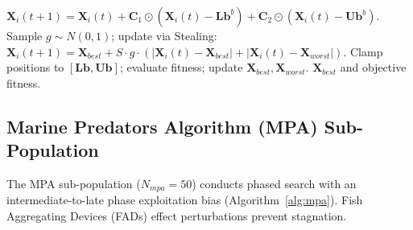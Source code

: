 \documentclass[journal,compsoc]{IEEEtran}
\begin{document}
\begin{algorithm}[!t]
\begin{algorithmic}[1]
        $\mathbf{X}_i(t+1) = \mathbf{X}_i(t) + \mathbf{C}_1 \odot (\mathbf{X}_i(t) - \mathbf{Lb}^b) + \mathbf{C}_2 \odot (\mathbf{X}_i(t) - \mathbf{Ub}^b)$.
    \ENDFOR
        \STATE Sample $g \sim N(0, 1)$; update via Stealing: \\
        $\mathbf{X}_i(t+1) = \mathbf{X}_{best} + S \cdot g \cdot (|\mathbf{X}_i(t) - \mathbf{X}_{best}| + |\mathbf{X}_i(t) - \mathbf{X}_{worst}|)$.
    \ENDFOR
    \STATE Clamp positions to $[\mathbf{Lb}, \mathbf{Ub}]$; evaluate fitness; update $\mathbf{X}_{best}, \mathbf{X}_{worst}$.
\ENDFOR
\RETURN $\mathbf{X}_{best}$ and objective fitness.
\end{algorithmic}
\end{algorithm}

\subsection{Marine Predators Algorithm (MPA) Sub-Population}
The MPA sub-population ($N_{mpa} = 50$) conducts phased search with an intermediate-to-late phase exploitation bias (Algorithm~\ref{alg:mpa}). Fish Aggregating Devices (FADs) effect perturbations prevent stagnation.
\end{document}
